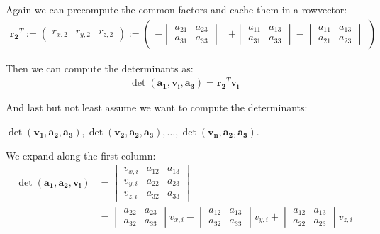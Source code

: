 \documentclass{article}
\newcommand{\vctr}[1]{\mathbf{#1}}
\newcommand{\rowvec}[1]{\begin{pmatrix}#1\end{pmatrix}}
\newcommand{\matCol}[1]{\vctr{a_{#1}}}
\begin{document}
Again we can precompute the common factors and cache them in a rowvector:
\begin{align*}
\vctr{r_2}^T := \rowvec{r_{x, 2} & r_{y, 2} & r_{z, 2}} := 
\rowvec{
-\begin{vmatrix}
a_{21} & a_{23} \\
a_{31} & a_{33}
\end{vmatrix} &
+ \begin{vmatrix}
a_{11} & a_{13} \\
a_{31} & a_{33}
\end{vmatrix}
- \begin{vmatrix}
a_{11} & a_{13} \\
a_{21} & a_{23}
\end{vmatrix}}
\end{align*}

Then we can compute the determinants as:
\begin{align*}
\det(\matCol{1}, \vctr{v_i}, \matCol{3}) = \vctr{r_2}^T \vctr{v_i}
\end{align*}

And last but not least assume we want to compute the determinants: 

\(\det(\vctr{v_1}, \matCol{2}, \matCol{3}), \det(\vctr{v_2}, \matCol{2}, \matCol{3}), \dots, \det(\vctr{v_n}, \matCol{2}, \matCol{3})\).

We expand along the first column:
\begin{align*}
\det(\matCol{1}, \matCol{2}, \vctr{v_i}) &= 
\begin{vmatrix}
v_{x, i} & a_{12} & a_{13} \\
v_{y, i} & a_{22} & a_{23} \\
v_{z, i} & a_{32} & a_{33}
\end{vmatrix} \\
&= \begin{vmatrix}
a_{22} & a_{23} \\
a_{32} & a_{33}
\end{vmatrix} v_{x, i}
- \begin{vmatrix}
a_{12} & a_{13} \\
a_{32} & a_{33}
\end{vmatrix} v_{y, i}
+ \begin{vmatrix}
a_{12} & a_{13} \\
a_{22} & a_{23}
\end{vmatrix} v_{z, i}
\end{align*}
\end{document}
